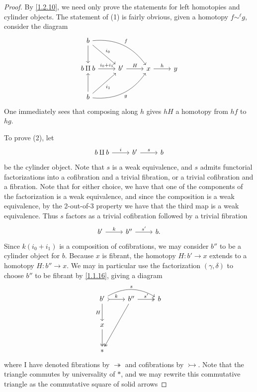 \begin{proof}
	By \cref{1.2.10}, we need only prove the statements for left homotopies and cylinder objects. The statement of (1) is fairly obvious, given a homotopy $f\sim ^\ell g$, consider the diagram
	\[\begin{tikzcd}[row sep = 2.5em, column sep = 2.5em]
	b \ar[" i_0 ", dr] \ar[" f ", bend left, drr] \ar[d]  &  &  \\
	b\amalg b \ar[" i_0+i_1 ", r]  & b' \ar[" H ", r]  & x\ar[" h ", r]  & y\\
	b \ar[" i_1 "', ur] \ar[" g "', bend right, urr] \ar[u]  &  & 
	\end{tikzcd}\]
	One immediately sees that composing along $h$ gives $hH$ a homotopy from $hf$ to $hg$.

	To prove (2), let
	\[\begin{tikzcd}[row sep = 2.5em, column sep = 2.5em]
	b\amalg b \ar[" i ", r]  & b'\ar[" s ", r]  & b
	\end{tikzcd}\]
	be the cylinder object. Note that $s$ is a weak equivalence, and $s$ admits functorial factorizations into a cofibration and a trivial fibration, or a trivial cofibration and a fibration. Note that for either choice, we have that one of the components of the factorization is a weak equivalence, and since the composition is a weak equivalence, by the 2-out-of-3 property we have that the third map is a weak equivalence. Thus $s$ factors as a trivial cofibration followed by a trivial fibration
	\[\begin{tikzcd}[row sep = 2.5em, column sep = 2.5em]
		b' \ar[" k ", r] & b'' \ar[" s' ", r]  & b.
	\end{tikzcd}\]
	Since $k(i_0+i_1)$ is a composition of cofibrations, we may consider $b''$ to be a cylinder object for $b$. Because $x$ is fibrant, the homotopy $H : b' \to x$ extends to a homotopy $H : b'' \to x$. We may in particular use the factorization $(\gamma,\delta)$ to choose $b''$ to be fibrant by \cref{1.1.16}, giving a diagram
	\[\begin{tikzcd}[row sep = 2.5em, column sep = 2.5em]
	b' \ar[" k ", tail, r] \ar[" H "', d] \ar[" s ", bend left, rr]  & b'' \ar[" s' ", two heads, r] \ar[two heads, ddl]  & b \\
	x \ar[two heads, d]  &  &  \\
	* &  & 
	\end{tikzcd}\]
	where I have denoted fibrations by $\twoheadrightarrow$ and cofibrations by $\rightarrowtail$. Note that the triangle commutes by universality of $*$, and we may rewrite this commutative triangle as the commutative square of solid arrows

\end{proof}
